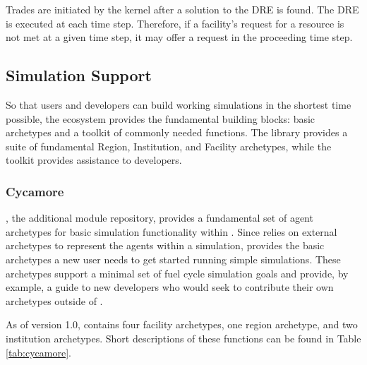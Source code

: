 Trades are initiated by the \Cyclus kernel after a solution to the DRE is
found. The DRE is executed at each time step. Therefore, if a facility's request
for a resource is not met at a given time step, it may offer a request in the
proceeding time step. 

\subsection{Simulation Support}
So that users and developers can build working simulations
in the shortest time possible, the \Cyclus ecosystem provides the fundamental 
building blocks: basic archetypes and a toolkit of commonly needed functions.
The \Cycamore library provides a suite of fundamental Region, Institution, and 
Facility archetypes, while the \Cyclus toolkit provides assistance to 
developers.

\subsubsection{Cycamore}

\Cycamore \cite{carlsen_cycamore_2014}, the \Cyclus additional module
repository, provides a fundamental set of agent archetypes for basic simulation 
functionality within \Cyclus.  Since \Cyclus relies on external 
archetypes to represent the agents within a simulation, \Cycamore provides the 
basic archetypes a new user needs to get started running simple simulations.  
These archetypes support a minimal set of fuel cycle simulation goals and 
provide, by example, a guide to new developers who would seek to contribute 
their own archetypes outside of \Cycamore.

As of version 1.0, \Cycamore contains four facility archetypes, one region 
archetype, and two institution archetypes. Short descriptions of these 
functions can be found in Table \ref{tab:cycamore}.


